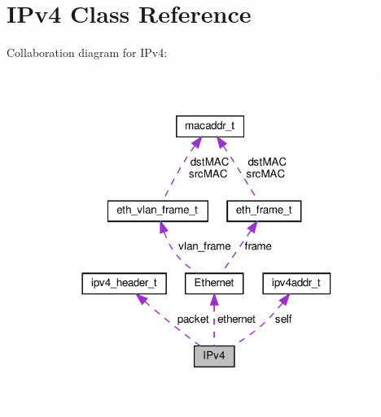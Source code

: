 \hypertarget{classIPv4}{}\section{I\+Pv4 Class Reference}
\label{classIPv4}


Collaboration diagram for I\+Pv4\+:\nopagebreak
\begin{figure}[H]
\begin{center}
\leavevmode
\includegraphics[width=309pt]{classIPv4__coll__graph}
\end{center}
\end{figure}

